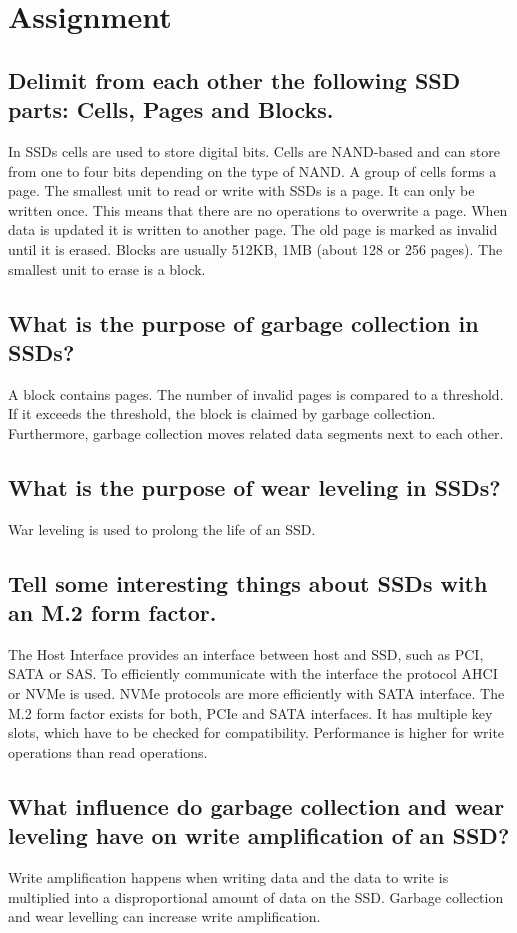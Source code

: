 \documentclass[runningheads]{llncs}
\begin{document}
\section{Assignment}

\subsection{Delimit from each other the following SSD parts: Cells, Pages and Blocks.}
In SSDs cells are used to store digital bits. 
Cells are NAND-based and can store from one to four bits depending on the type of NAND.
A group of cells forms a page. The smallest unit to read or write with SSDs is a page.
It can only be written once. This means that there are no operations to overwrite a page.
When data is updated it is written to another page. 
The old page is marked as invalid until it is erased.
Blocks are usually 512KB, 1MB (about 128 or 256 pages). The smallest unit to erase is a block.

\subsection{What is the purpose of garbage collection in SSDs?}
A block contains pages. The number of invalid pages is compared to a threshold. 
If it exceeds the threshold, the block is claimed by garbage collection.
Furthermore, garbage collection moves related data segments next to each other.

\subsection{What is the purpose of wear leveling in SSDs?}
War leveling is used to prolong the life of an SSD.

\subsection{Tell some interesting things about SSDs with an M.2 form factor.}
The Host Interface provides an interface between host and SSD, such as PCI, SATA or SAS.
To efficiently communicate with the interface the protocol AHCI or NVMe is used.
NVMe protocols are more efficiently with SATA interface.
The M.2 form factor exists for both, PCIe and SATA interfaces.
It has multiple key slots, which have to be checked for compatibility.
Performance is higher for write operations than read operations.


\subsection{What influence do garbage collection and wear leveling have on write amplification of an SSD?}
Write amplification happens when writing data and the data to write is multiplied into a disproportional amount of data on the SSD.
Garbage collection and wear levelling can increase write amplification.
\end{document}
